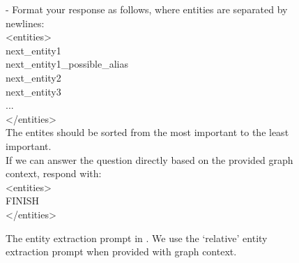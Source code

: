\begin{figure}
\begin{minipage}{1\columnwidth}
\begin{tcolorbox}[title=\glink's Entity Extraction Prompt]
    - Format your response as follows, where entities are separated by newlines: \\

    <entities> \\
    next\_entity1 \\
    next\_entity1\_possible\_alias \\
    next\_entity2 \\
    next\_entity3 \\
    ... \\
    </entities> \\

    The entites should be sorted from the most important to the least important.  \\
    If we can answer the question directly based on the provided graph context, respond with: \\
    <entities> \\
    FINISH \\
    </entities> \\
    \end{tcolorbox}

\caption{The entity extraction prompt in \glink. We use the `relative' entity extraction prompt when provided with graph context.  }
\label{fig:linker-entity-prompt}
\end{minipage}
\end{figure}
